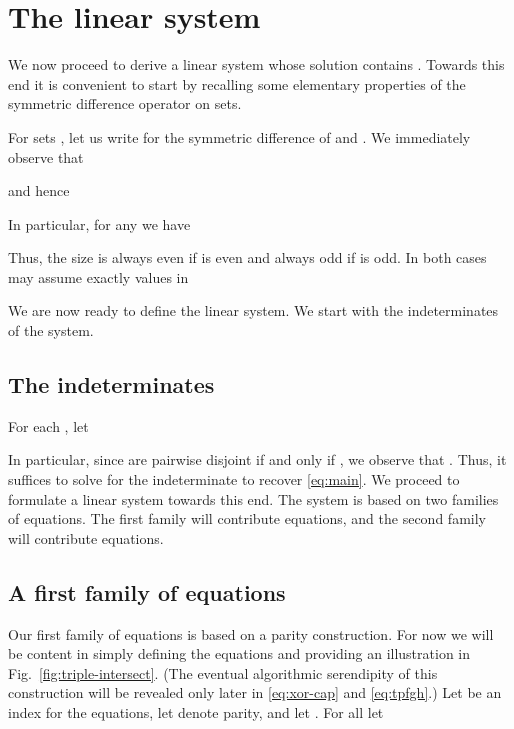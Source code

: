 \documentclass{amsart}
\begin{document}
\section{The linear system}
\label{sect:system}

We now proceed to derive a linear system whose solution contains
. Towards this end it is convenient to start by
recalling some elementary properties of the symmetric difference 
operator on sets.

For sets , let us write 
 for the symmetric 
difference of  and . We immediately observe that 

and hence

In particular, for any  we have 

Thus, the size  is always even if  is even 
and always odd if  is odd. In both cases 
may assume exactly  values in


We are now ready to define the  linear system. 
We start with the indeterminates of the system.

\subsection{The indeterminates}
For each , let 

In particular, since  are pairwise 
disjoint if and only if , 
we observe that . 
Thus, it suffices to solve for the indeterminate  
to recover \eqref{eq:main}. We proceed to formulate a linear
system towards this end. The system is based on two families
of equations. The first family will contribute  equations,
and the second family will contribute  equations. 

\subsection{A first family of equations}
Our first family of equations is based on a parity construction.
For now we will be content in simply defining the equations
and providing an illustration in Fig.~\ref{fig:triple-intersect}.
(The eventual algorithmic serendipity of this construction will be
revealed only later in \eqref{eq:xor-cap} and \eqref{eq:tpfgh}.)
Let  be an index for the equations,
let  denote parity, and let .
For all  let
\end{document}
